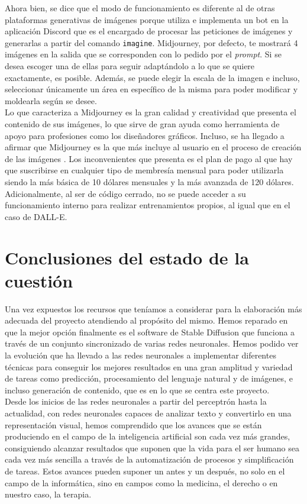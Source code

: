 Ahora bien, se dice que el modo de funcionamiento es diferente al de otras plataformas generativas de imágenes porque utiliza e implementa un bot en la aplicación Discord que es el encargado de procesar las peticiones de imágenes y generarlas a partir del comando \texttt{imagine}. Midjourney, por defecto, te mostrará 4 imágenes en la salida que se corresponden con lo pedido por el \textit{prompt}. Si se desea escoger una de ellas para seguir adaptándolo a lo que se quiere exactamente, es posible. Además, se puede elegir la escala de la imagen e incluso, seleccionar únicamente un área en específico de la misma para poder modificar y moldearla según se desee. \\

Lo que caracteriza a Midjourney es la gran calidad y creatividad que presenta el contenido de sus imágenes, lo que sirve de gran ayuda como herramienta de apoyo para profesiones como los diseñadores gráficos. Incluso, se ha llegado a afirmar que Midjourney es la que más incluye al usuario en el proceso de creación de las imágenes \citep{jaruga2022artificial}. Los inconvenientes que presenta es el plan de pago al que hay que suscribirse en cualquier tipo de membresía mensual para poder utilizarla siendo la más básica de 10 dólares mensuales y la más avanzada de 120 dólares. Adicionalmente, al ser de código cerrado, no se puede acceder a su funcionamiento interno para realizar entrenamientos propios, al igual que en el caso de DALL-E. \\


\section{Conclusiones del estado de la cuestión}

Una vez expuestos los recursos que teníamos a considerar para la elaboración más adecuada del proyecto atendiendo al propósito del mismo. Hemos reparado en que la mejor opción finalmente es el software de Stable Diffusion que funciona a través de un conjunto sincronizado de varias redes neuronales. Hemos podido ver la evolución que ha llevado a las redes neuronales a implementar diferentes técnicas para conseguir los mejores resultados en una gran amplitud y variedad de tareas como predicción, procesamiento del lenguaje natural y de imágenes, e incluso generación de contenido, que es en lo que se centra este proyecto. \\

Desde los inicios de las redes neuronales a partir del perceptrón hasta la actualidad, con redes neuronales capaces de analizar texto y convertirlo en una representación visual, hemos comprendido que los avances que se están produciendo en el campo de la inteligencia artificial son cada vez más grandes, consiguiendo alcanzar resultados que suponen que la vida para el ser humano sea cada vez más sencilla a través de la automatización de procesos y simplificación de tareas. Estos avances pueden suponer un antes y un después, no solo en el campo de la informática, sino en campos como la medicina, el derecho o en nuestro caso, la terapia.\\ 

